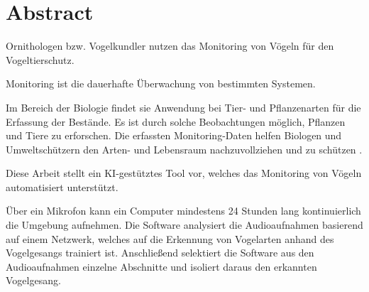 \section*{Abstract}


Ornithologen bzw. Vogelkundler nutzen das Monitoring von Vögeln für den Vogeltierschutz.

Monitoring ist die dauerhafte Überwachung von bestimmten Systemen.

Im Bereich der Biologie findet sie Anwendung bei Tier- und Pflanzenarten für die Erfassung der Bestände. Es ist durch solche Beobachtungen möglich, Pflanzen und Tiere zu erforschen. Die erfassten Monitoring-Daten helfen Biologen und Umweltschützern den Arten- und Lebensraum nachzuvollziehen und zu schützen .

Diese Arbeit stellt ein KI-gestütztes Tool vor, welches das Monitoring von Vögeln automatisiert unterstützt.

Über ein Mikrofon kann ein Computer mindestens 24 Stunden lang kontinuierlich die Umgebung aufnehmen. Die Software analysiert die Audioaufnahmen basierend auf einem Netzwerk, welches auf die Erkennung von Vogelarten anhand des Vogelgesangs trainiert ist. Anschließend selektiert die Software aus den Audioaufnahmen einzelne Abschnitte und isoliert daraus den erkannten Vogelgesang.

 






